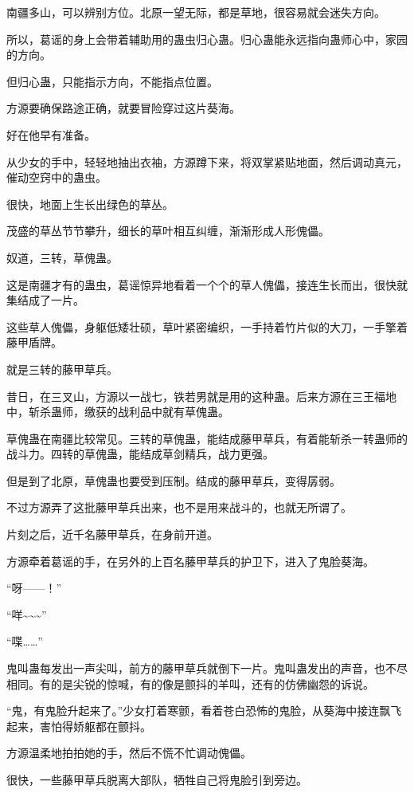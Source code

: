 \begin{this_body}
南疆多山，可以辨别方位。北原一望无际，都是草地，很容易就会迷失方向。

所以，葛谣的身上会带着辅助用的蛊虫归心蛊。归心蛊能永远指向蛊师心中，家园的方向。

但归心蛊，只能指示方向，不能指点位置。

方源要确保路途正确，就要冒险穿过这片葵海。

好在他早有准备。

从少女的手中，轻轻地抽出衣袖，方源蹲下来，将双掌紧贴地面，然后调动真元，催动空窍中的蛊虫。

很快，地面上生长出绿色的草丛。

茂盛的草丛节节攀升，细长的草叶相互纠缠，渐渐形成人形傀儡。

奴道，三转，草傀蛊。

这是南疆才有的蛊虫，葛谣惊异地看着一个个的草人傀儡，接连生长而出，很快就集结成了一片。

这些草人傀儡，身躯低矮壮硕，草叶紧密编织，一手持着竹片似的大刀，一手擎着藤甲盾牌。

就是三转的藤甲草兵。

昔日，在三叉山，方源以一战七，铁若男就是用的这种蛊。后来方源在三王福地中，斩杀蛊师，缴获的战利品中就有草傀蛊。

草傀蛊在南疆比较常见。三转的草傀蛊，能结成藤甲草兵，有着能斩杀一转蛊师的战斗力。四转的草傀蛊，能结成草剑精兵，战力更强。

但是到了北原，草傀蛊也要受到压制。结成的藤甲草兵，变得孱弱。

不过方源弄了这批藤甲草兵出来，也不是用来战斗的，也就无所谓了。

片刻之后，近千名藤甲草兵，在身前开道。

方源牵着葛谣的手，在另外的上百名藤甲草兵的护卫下，进入了鬼脸葵海。

“呀——！”

“咩\~{}\~{}\~{}”

“喋……”

鬼叫蛊每发出一声尖叫，前方的藤甲草兵就倒下一片。鬼叫蛊发出的声音，也不尽相同。有的是尖锐的惊喊，有的像是颤抖的羊叫，还有的仿佛幽怨的诉说。

“鬼，有鬼脸升起来了。”少女打着寒颤，看着苍白恐怖的鬼脸，从葵海中接连飘飞起来，害怕得娇躯都在颤抖。

方源温柔地拍拍她的手，然后不慌不忙调动傀儡。

很快，一些藤甲草兵脱离大部队，牺牲自己将鬼脸引到旁边。

\end{this_body}

